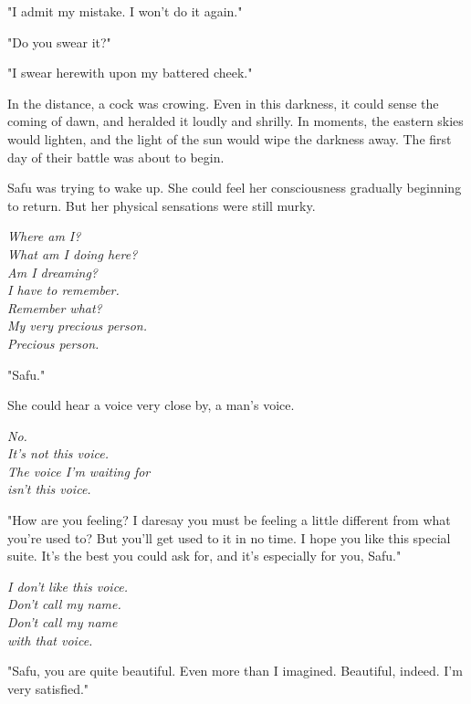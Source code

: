 "I admit my mistake. I won't do it again."

"Do you swear it?"

"I swear herewith upon my battered cheek."

In the distance, a cock was crowing. Even in this darkness, it could
sense the coming of dawn, and heralded it loudly and shrilly. In
moments, the eastern skies would lighten, and the light of the sun would
wipe the darkness away. The first day of their battle was about to
begin.

\mybreak

Safu was trying to wake up. She could feel her consciousness gradually
beginning to return. But her physical sensations were still murky.

\myspace

\emph{Where am I?\\
	What am I doing here?\\
	Am I dreaming?\\
	I have to remember.\\
	Remember what?\\
	My very precious person.\\
	Precious person.}

\myspace

"Safu."

She could hear a voice very close by, a man's voice.

\myspace

\emph{No.\\
	It's not this voice.\\
	The voice I'm waiting for\\
	isn't this voice.}

\myspace

"How are you feeling? I daresay you must be feeling a little different
from what you're used to? But you'll get used to it in no time. I hope
you like this special suite. It's the best you could ask for, and it's
especially for you, Safu."

\myspace

\emph{I don't like this voice.\\
	Don't call my name.\\
	Don't call my name\\
	with that voice.}

\myspace

"Safu, you are quite beautiful. Even more than I imagined. Beautiful,
indeed. I'm very satisfied."

\myspace

